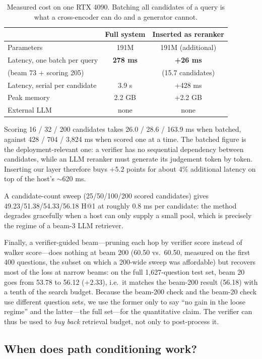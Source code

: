 \documentclass[sigconf,review,anonymous]{acmart}
\begin{document}
\begin{table}[t]
\centering\small
\caption{Measured cost on one RTX 4090. Batching all candidates of a query is what a cross-encoder can do and a generator cannot.}
\label{tab:cost}
\begin{tabular}{lcc}
\toprule
 & Full system & Inserted as reranker \\
\midrule
Parameters & 191M & 191M (additional) \\
Latency, one batch per query & \textbf{278 ms} & \textbf{+26 ms} \\
\quad (beam 73 + scoring 205) & & (15.7 candidates) \\
Latency, serial per candidate & 3.9 s & +428 ms \\
Peak memory & 2.2 GB & +2.2 GB \\
External LLM & none & none \\
\bottomrule
\end{tabular}
\end{table}

Scoring 16 / 32 / 200 candidates takes 26.0 / 28.6 / 163.9 ms when batched, against 428 / 704 / 3,824 ms when scored one at a time. The batched figure is the deployment-relevant one: a verifier has no sequential dependency between candidates, while an LLM reranker must generate its judgement token by token. Inserting our layer therefore buys $+5.2$ points for about 4\% additional latency on top of the host's $\sim$620 ms.

A candidate-count sweep (25/50/100/200 scored candidates) gives 49.23/51.38/54.33/56.18 H@1 at roughly 0.8 ms per candidate: the method degrades gracefully when a host can only supply a small pool, which is precisely the regime of a beam-3 LLM retriever.

Finally, a verifier-guided beam---pruning each hop by verifier score instead of walker score---does nothing at beam 200 (60.50 vs.\ 60.50, measured on the first 400 questions, the subset on which a 200-wide sweep was affordable) but recovers most of the loss at narrow beams: on the full 1,627-question test set, beam 20 goes from 53.78 to 56.12 ($+2.33$), i.e.\ it matches the beam-200 result (56.18) with a tenth of the search budget. Because the beam-200 check and the beam-20 check use different question sets, we use the former only to say ``no gain in the loose regime'' and the latter---the full set---for the quantitative claim. The verifier can thus be used to \emph{buy back} retrieval budget, not only to post-process it.

\subsection{When does path conditioning work?}
\label{sec:boundary}
\end{document}
